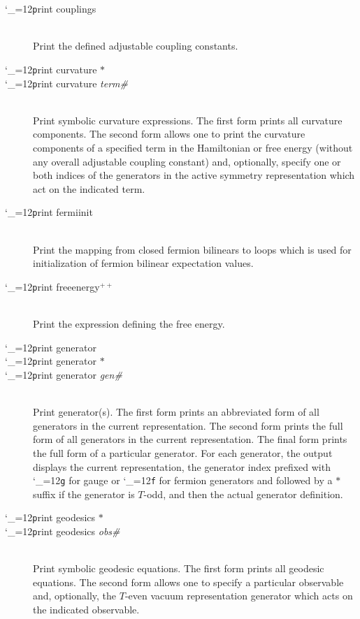 \documentclass [12pt]{article}
\makeatletter
\renewcommand{\tt}{\begingroup\catcode`_=12\def\_{\string_}\tt@}
\newcommand{\tt@}[1]{\texttt{#1}\endgroup}
\makeatother
\begin{document}
\begin{description}
\item [\tt print couplings]~\\
    Print the defined adjustable coupling constants.

\item [\tt print curvature $*$] \bgroup \itemsep 0pt \parskip 0pt
\item [\tt print curvature {\it term\#} {\tt{[}}{\it gen\#$_2$}
    {\tt{[}}{\it gen\#$_2$}{\tt{]}}{\tt{]}} ]~\\
    Print symbolic curvature expressions.
    The first form prints all curvature components.
    The second form allows one to print the curvature components
    of a specified term in the Hamiltonian or free energy
    (without any overall adjustable coupling constant)
    and, optionally, specify one or both
    indices of the generators in the active symmetry representation
    which act on the indicated term.
\egroup

\item [\tt print fermiinit]~\\
    Print the mapping from closed fermion bilinears to loops which
    is used for initialization of fermion bilinear expectation values.

\item [\tt print freeenergy$^{++}$]~\\
    Print the expression defining the free energy.

\item [\tt print generator] \bgroup \itemsep 0pt \parskip 0pt
\item [\tt print generator $*$]
\item [\tt print generator {\it gen\#}]~\\
    Print generator(s).
    The first form prints an abbreviated form of all generators in the
    current representation.
    The second form prints the full form of all generators in the
    current representation.
    The final form prints the full form of a particular generator.
    For each generator,
    the output displays the current representation, the generator index
    prefixed with \tt{g} for gauge or \tt{f} for fermion generators
    and followed by a $*$ suffix if the generator is $T$-odd,
    and then the actual generator definition.
\egroup

\item [\tt print geodesics $*$] \bgroup \itemsep 0pt \parskip 0pt
\item [\tt print geodesics {\it obs\#} {\tt{[}}{\it gen\#}{\tt{]}}]~\\
    Print symbolic geodesic equations.
    The first form prints all geodesic equations.
    The second form allows one to specify a particular observable
    and, optionally, the $T$-even vacuum representation generator
    which acts on the indicated observable.
\egroup


\end{description}
\end{document}
